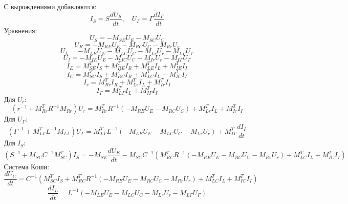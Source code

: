 	С вырождениями добавляются:
	\begin{equation}
		I_S = S \frac{d U_S}{dt}, \quad U_\Gamma = \Gamma \frac{d I_\Gamma}{dt}
	\end{equation}
	Уравнения:
	\begin{equation}
		U_S = -M_{SE} U_E - M_{SC} U_C
	\end{equation}
	\begin{equation}
		U_R = -M_{RE} U_E - M_{RC} U_C - M_{Rr} U_r
	\end{equation}
	\begin{equation}
		U_L = -M_{LE} U_E - M_{LC} U_C - M_{Lr} U_r - M_{L\Gamma} U_\Gamma
	\end{equation}
	\begin{equation}
		U_I = -M_{IE} U_E - M_{IC} U_C - M_{Ir} U_r - M_{I\Gamma} U_\Gamma
	\end{equation}
	\begin{equation}
		I_E = M_{SE}^T I_S + M_{RE}^T I_R + M_{LE}^T I_L + M_{IE}^T I_I
	\end{equation}
	\begin{equation}
		I_C = M_{SC}^T I_S + M_{RC}^T I_R + M_{LC}^T I_L + M_{IC}^T I_I
	\end{equation}
	\begin{equation}
		I_r = M_{Rr}^T I_R + M_{Lr}^T I_L + M_{Ir}^T I_I
	\end{equation}
	\begin{equation}
		I_\Gamma = M_{L\Gamma}^T I_L + M_{I\Gamma}^T I_I
	\end{equation}
	Для $U_r$:
	\begin{equation}
		(r^{-1} + M_{Rr}^T R^{-1} M_{Rr}) U_r = M_{Rr}^T R^{-1} (-M_{RE} U_E - M_{RC} U_C) + M_{Lr}^T I_L + M_{Ir}^T I_I
	\end{equation}
	Для $U_\Gamma$:
	\begin{equation}
		(\Gamma^{-1} + M_{L\Gamma}^T L^{-1} M_{L\Gamma}) U_\Gamma = M_{L\Gamma}^T L^{-1} (-M_{LE} U_E - M_{LC} U_C - M_{Lr} U_r) + M_{I\Gamma}^T \frac{d I_I}{dt}
	\end{equation}
	Для $I_S$:
	\begin{equation}
		(S^{-1} + M_{SC} C^{-1} M_{SC}^T) I_S = -M_{SE} \frac{d U_E}{dt} - M_{SC} C^{-1} (M_{RC}^T R^{-1} (-M_{RE} U_E - M_{RC} U_C - M_{Rr} U_r) + M_{LC}^T I_L + M_{IC}^T I_I)
	\end{equation}
	Система Коши:
	\begin{equation}
		\frac{d U_C}{dt} = C^{-1} (M_{SC}^T I_S + M_{RC}^T R^{-1} (-M_{RE} U_E - M_{RC} U_C - M_{Rr} U_r) + M_{LC}^T I_L + M_{IC}^T I_I)
	\end{equation}
	\begin{equation}
		\frac{d I_L}{dt} = L^{-1} (-M_{LE} U_E - M_{LC} U_C - M_{Lr} U_r - M_{L\Gamma} U_\Gamma)
	\end{equation}
	
